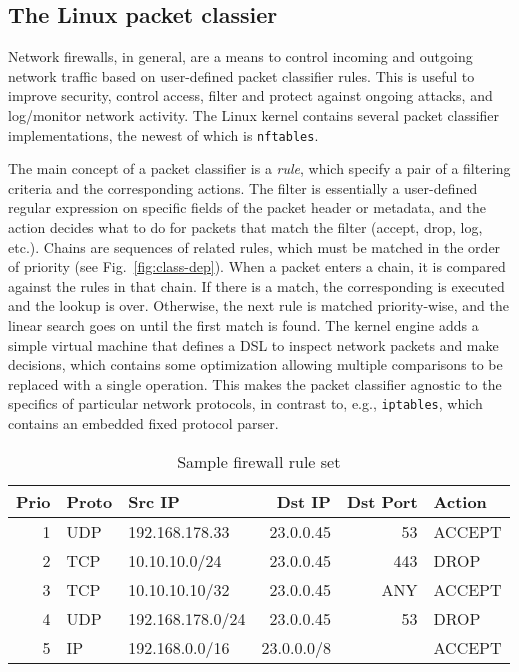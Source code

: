 \subsection{The Linux packet classier}
\label{sec:sa-pack-class}

Network firewalls, in general, are a means to control incoming and outgoing network traffic based on user-defined packet classifier rules. This is useful to improve security, control access, filter and protect against ongoing attacks, and log\slash monitor network activity. The Linux kernel contains several packet classifier implementations, the newest of which is \texttt{nftables}.

The main concept of a packet classifier is a \emph{rule}, which specify a pair of a filtering criteria and the corresponding actions. The filter is essentially a user-defined regular expression on specific fields of the packet header or metadata, and the action decides what to do for packets that match the filter (accept, drop, log, etc.). Chains are sequences of related rules, which must be matched in the order of priority (see Fig.~\ref{fig:class-dep}). When a packet enters a chain, it is compared against the rules in that chain. If there is a match, the corresponding is executed and the lookup is over. Otherwise, the next rule is matched priority-wise, and the linear search goes on until the first match is found.  The \nftables kernel engine adds a simple virtual machine that defines a DSL to inspect network packets and make decisions, which contains some optimization allowing multiple comparisons to be replaced with a single operation. This makes the \nftables packet classifier agnostic to the specifics of particular network protocols, in contrast to, e.g., \texttt{iptables}, which contains an embedded fixed protocol parser.

\begin{table}[t]
  \centering
  \begin{small}
    \renewcommand{\tabcolsep}{2pt}
    \begin{tabular}{r|l|l|r|r|l}
      \textbf{Prio} & \textbf{Proto} & \textbf{Src IP} & \textbf{Dst IP} & \textbf{Dst Port} & \textbf{Action}\\
      \hline
      1 & UDP & 192.168.178.33 & 23.0.0.45 & 53 & ACCEPT\\
      2 & TCP & 10.10.10.0/24 & 23.0.0.45 & 443 & DROP\\
      3 & TCP & 10.10.10.10/32 & 23.0.0.45 & ANY & ACCEPT\\
      4 & UDP & 192.168.178.0/24 & 23.0.0.45 & 53 & DROP\\
      5 & IP & 192.168.0.0/16 & 23.0.0.0/8 &  & ACCEPT\\
    \end{tabular}
  \end{small}%
  \caption{Sample firewall rule set}
  \label{fig:class-sample}
\end{table}

